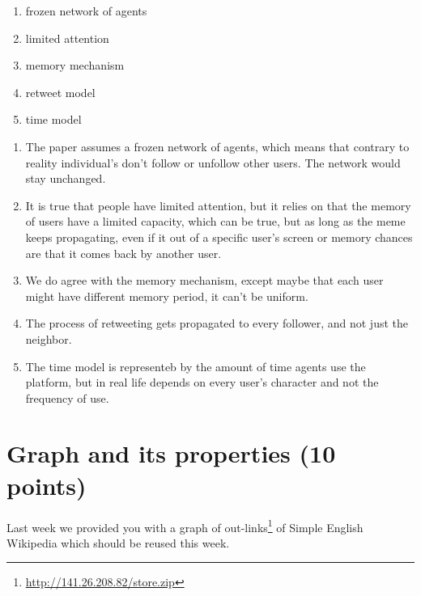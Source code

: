 \documentclass{WeSTassignment}
\begin{document}
\begin{enumerate}
\item frozen network of agents
\item limited attention
\item memory mechanism
\item retweet model
\item time model
\end{enumerate}

\begin{enumerate}
\item The paper assumes a frozen network of agents, which means that contrary to reality individual's don't follow or unfollow other users. The network would stay unchanged.
\item It is true that people have limited attention, but it relies on that the memory of users have a limited capacity, which can be true, but as long as the meme keeps propagating, even if it out of a specific user's screen or memory chances are that it comes back by another user.
\item We do agree with the memory mechanism, except maybe that each user might have different memory period, it can't be uniform.
\item The process of retweeting gets propagated to every follower, and not just the neighbor.
\item The time model is representeb by the amount of time agents use the platform, but in real life depends on every user's character and not the frequency of use.
\end{enumerate}




\section{Graph and its properties (10 points)}

Last week we provided you with a graph of out-links\footnote{\url{http://141.26.208.82/store.zip}} of Simple English Wikipedia which should be reused this week. 
\end{document}
